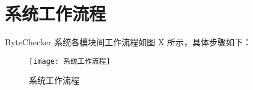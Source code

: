 \documentclass[print, master, vlined, timesmath]{DissertUESTC}
\begin{document}








\section{系统工作流程}
ByteChecker 系统各模块间工作流程如图 X 所示，具体步骤如下：

\begin{figure}[htbp]
    \centering
    \texttt{[image: 系统工作流程]}
    \caption{系统工作流程}
    \label{fig:系统工作流程}
\end{figure}
\end{document}
